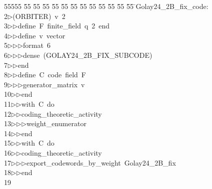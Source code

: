 %
%
\begin{tabbing}
55555 \= 55 \= 55 \= 55 \= 55 \= 55 \= 55 \= 55 \= 55 \= 55 \= 55 \= 55 \= 55 \= \>Golay24\_2B\_fix\_code:\\[0pt]
2\>$\triangleright$\>(ORBITER)\ v\ 2\ \\[0pt]
3\>$\triangleright$\>$\triangleright$\>define\ F\ finite\_field\ q\ 2\ end\ \\[0pt]
4\>$\triangleright$\>$\triangleright$\>define\ v\ vector\ \\[0pt]
5\>$\triangleright$\>$\triangleright$\>$\triangleright$\>format\ 6\ \\[0pt]
6\>$\triangleright$\>$\triangleright$\>$\triangleright$\>dense\ (GOLAY24\_2B\_FIX\_SUBCODE)\ \\[0pt]
7\>$\triangleright$\>$\triangleright$\>end\ \\[0pt]
8\>$\triangleright$\>$\triangleright$\>define\ C\ code\ field\ F\ \\[0pt]
9\>$\triangleright$\>$\triangleright$\>$\triangleright$\>generator\_matrix\ v\ \\[0pt]
10\>$\triangleright$\>$\triangleright$\>end\ \\[0pt]
11\>$\triangleright$\>$\triangleright$\>with\ C\ do\ \\[0pt]
12\>$\triangleright$\>$\triangleright$\>coding\_theoretic\_activity\ \\[0pt]
13\>$\triangleright$\>$\triangleright$\>$\triangleright$\>weight\_enumerator\ \\[0pt]
14\>$\triangleright$\>$\triangleright$\>end\ \\[0pt]
15\>$\triangleright$\>$\triangleright$\>with\ C\ do\ \\[0pt]
16\>$\triangleright$\>$\triangleright$\>coding\_theoretic\_activity\ \\[0pt]
17\>$\triangleright$\>$\triangleright$\>$\triangleright$\>export\_codewords\_by\_weight\ Golay24\_2B\_fix\ \\[0pt]
18\>$\triangleright$\>$\triangleright$\>end\\[0pt]
19\>\end{tabbing}
